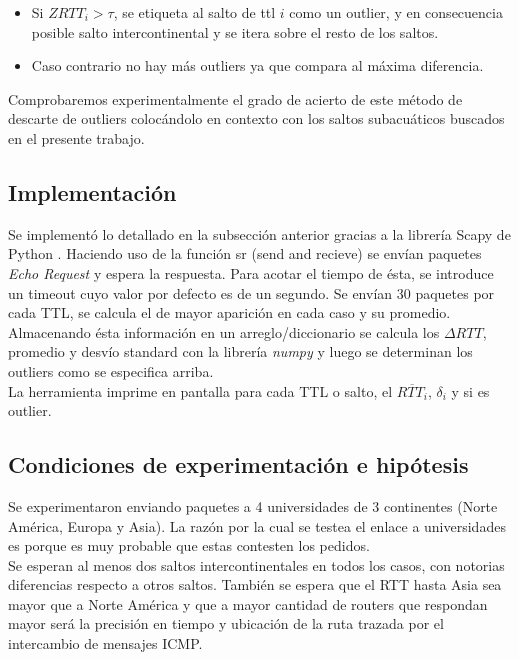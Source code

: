 \begin{itemize}
\item Si $ZRTT_{i} > \tau$, se etiqueta al salto de ttl $i$ como un outlier, y en consecuencia posible salto intercontinental y se itera sobre el resto de los saltos.
\item Caso contrario no hay más outliers ya que compara al máxima diferencia.
\end{itemize}

Comprobaremos experimentalmente el grado de acierto de este método de descarte de outliers colocándolo en contexto con los saltos subacuáticos buscados en el presente trabajo.\\


\subsection{Implementación}

Se implementó lo detallado en la subsección anterior gracias a la librería Scapy de Python \cite{Scapy}. Haciendo uso de la función sr (send and recieve) se envían paquetes \textit{Echo Request} y espera la respuesta. Para acotar el tiempo de ésta, se introduce un timeout cuyo valor por defecto es de un segundo. Se envían 30 paquetes por cada TTL, se calcula el de mayor aparición en cada caso y su promedio.\\

Almacenando ésta información en un arreglo/diccionario se calcula los $\Delta RTT$, promedio y desvío standard con la librería \textit{numpy} y luego se determinan los outliers como se especifica arriba.\\

La herramienta imprime en pantalla para cada TTL o salto, el $\overline{RTT_{i}}$, $\delta_{i}$ y si es outlier. 

\subsection{Condiciones de experimentación e hipótesis}

Se experimentaron enviando paquetes a 4 universidades de 3 continentes (Norte América, Europa y Asia). La razón por la cual se testea el enlace a universidades es porque es muy probable que estas contesten los pedidos.\\

Se esperan al menos dos saltos intercontinentales en todos los casos, con notorias diferencias respecto a otros saltos. También se espera que el RTT hasta Asia sea mayor que a Norte América y que a mayor cantidad de routers que respondan mayor será la precisión en tiempo y ubicación de la ruta trazada por el intercambio de mensajes ICMP.


